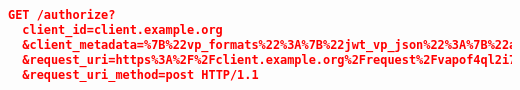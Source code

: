 


\begin{lstlisting}[language=json,firstnumber=1]
GET /authorize?
  client_id=client.example.org
  &client_metadata=%7B%22vp_formats%22%3A%7B%22jwt_vp_json%22%3A%7B%22alg%22%3A%5B%22EdDSA%22%2C%22ES256K%22%5D%7D%7D%2C%22negotiation_endpoint%22%3A%22https%3A%2F%2Fexample.com%22%7D
  &request_uri=https%3A%2F%2Fclient.example.org%2Frequest%2Fvapof4ql2i7m41m68uep
  &request_uri_method=post HTTP/1.1
\end{lstlisting}